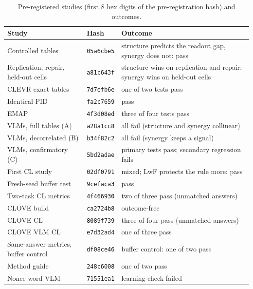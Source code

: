 \begin{table}[h]
\centering\small\setlength{\tabcolsep}{3pt}
\caption{Pre-registered studies (first 8 hex digits of the pre-registration hash) and outcomes.}
\label{tab:prereg}
\begin{tabular}{llp{6.2cm}}
\toprule
Study & Hash & Outcome \\
\midrule
Controlled tables & \texttt{05a6cbe5} & structure predicts the readout gap, synergy does not: pass \\
Replication, repair, held-out cells & \texttt{a81c643f} & structure wins on replication and repair; synergy wins on held-out cells \\
CLEVR exact tables & \texttt{7d7efb6e} & one of two tests pass \\
Identical PID & \texttt{fa2c7659} & pass \\
EMAP & \texttt{4f3d08ed} & three of four tests pass \\
VLMs, full tables (A) & \texttt{a28a1cc8} & all fail (structure and synergy collinear) \\
VLMs, decorrelated (B) & \texttt{b34f82c2} & all fail (synergy keeps a signal) \\
VLMs, confirmatory (C) & \texttt{5bd2adae} & primary tests pass; secondary regression fails \\
First CL study & \texttt{02df0791} & mixed; LwF protects the rule more: pass \\
Fresh-seed buffer test & \texttt{9cefaca3} & pass \\
Two-task CL metrics & \texttt{4f466930} & two of three pass (unmatched answers) \\
CLOVE build & \texttt{ca2724b8} & outcome-free \\
CLOVE CL & \texttt{8089f739} & three of four pass (unmatched answers) \\
CLOVE VLM CL & \texttt{e7d32ad4} & one of three pass \\
Same-answer metrics, buffer control & \texttt{df08ce46} & buffer control: one of two pass \\
Method guide & \texttt{248c6008} & one of two pass \\
Nonce-word VLM & \texttt{71551ea1} & learning check failed \\
\bottomrule
\end{tabular}
\end{table}


